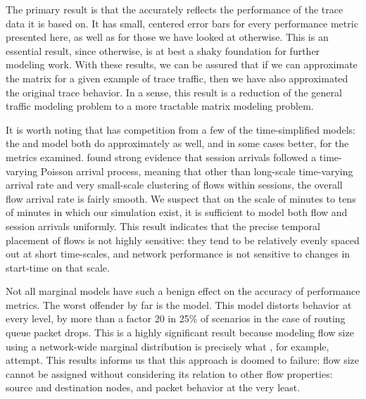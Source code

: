 \documentclass[twocolumn,final]{svjour3}
\begin{document}
The primary result is that the  accurately reflects the performance of the trace data it is based on. It has small, centered error bars for every performance metric presented here, as well as for those we have looked at otherwise. This is an essential result, since otherwise,  is at best a shaky foundation for further modeling work. With these results, we can be assured that if we can approximate the matrix for a given example of trace traffic, then we have also approximated the original trace behavior. In a sense, this result is a reduction of the general traffic modeling problem to a more tractable matrix modeling problem.

It is worth noting that  has competition from a few of the time-simplified models: the  and  model both do approximately as well, and in some cases better, for the metrics examined. {\FHC} found strong evidence that session arrivals followed a time-varying Poisson arrival process, meaning that other than long-scale time-varying arrival rate and very small-scale clustering of flows within sessions, the overall flow arrival rate is fairly smooth. We suspect that on the scale of minutes to tens of minutes in which our simulation exist, it is sufficient to model both flow and session arrivals uniformly. This result indicates that the precise temporal placement of flows is not highly sensitive: they tend to be relatively evenly spaced out at short time-scales, and network performance is not sensitive to changes in start-time on that scale.

Not all marginal models have such a benign effect on the accuracy of performance metrics. The worst offender by far is the  model. This model distorts behavior at every level, by more than a factor 20 in 25\% of scenarios in the case of routing queue packet drops. This is a highly significant result because modeling flow size using a network-wide marginal distribution is precisely what {\FHC}, for example, attempt. This results informs us that this approach is doomed to failure: flow size cannot be assigned without considering its relation to other flow properties: source and destination nodes, and packet behavior at the very least.
\end{document}
